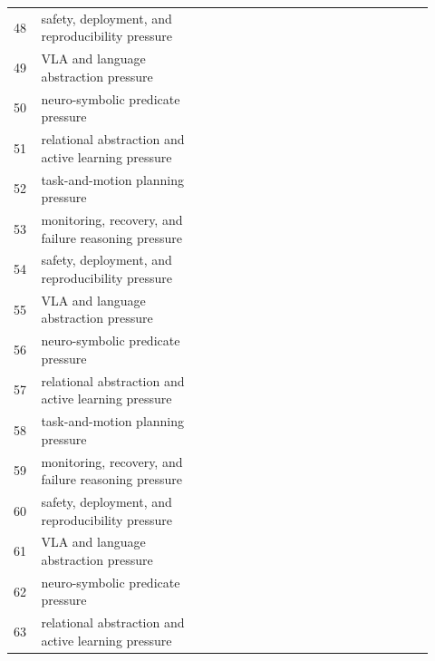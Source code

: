 \documentclass[11pt]{article}
\begin{document}
\begin{longtable}{p{0.06\linewidth}p{0.38\linewidth}p{0.48\linewidth}}
48 & safety, deployment, and reproducibility pressure & \citep{suvarna2023language142,vlaeva2021vision143,hao2023reasoning144} \\
49 & VLA and language abstraction pressure & \citep{zhang2025llmgrop145,hutahaean2025use146,perezmilans2018language147} \\
50 & neuro-symbolic predicate pressure & \citep{mohammadi2026parameterefficient148,liu2026arassisted149,winter2008trajectories150} \\
51 & relational abstraction and active learning pressure & \citep{baxter2023interpreting151,lyu2019sdrl152,schakkal2025hierarchical153} \\
52 & task-and-motion planning pressure & \citep{ding2026unilavira154,mu2024pix2planning155,kobilov2025automatic156} \\
53 & monitoring, recovery, and failure reasoning pressure & \citep{chu2025llmmap157,colan2025assessing158,lafon2025vilu159} \\
54 & safety, deployment, and reproducibility pressure & \citep{chen2026reconvla160,gu2025safe161,yang2025fpcvla162} \\
55 & VLA and language abstraction pressure & \citep{stewart2023large163,zhang2024firerobbrain164,ma2026a165} \\
56 & neuro-symbolic predicate pressure & \citep{liu2019languagelike166,zhou2024hard167,wang2024large168} \\
57 & relational abstraction and active learning pressure & \citep{hoffman2025feasibility169,yuxian2025bridging170,huang2025planning171} \\
58 & task-and-motion planning pressure & \citep{matuszek2021grounded172,aryashad2025vlag173,aghzal2024evaluating174} \\
59 & monitoring, recovery, and failure reasoning pressure & \citep{ordem2023participatory175,liu2026from176,wang2025image177} \\
60 & safety, deployment, and reproducibility pressure & \citep{green2022motion178,liu2026task179,lozano2025invisible180} \\
61 & VLA and language abstraction pressure & \citep{chen2026sustainable181,lin2024clmasp182,zhu2026designing183} \\
62 & neuro-symbolic predicate pressure & \citep{belta2005discrete184,silva2024robotic185,ganai2025realtime186} \\
63 & relational abstraction and active learning pressure & \citep{chen2025codeassymbolicplanner187,lu2025probing188,kwon2025large189} \\

\end{longtable}
\end{document}
